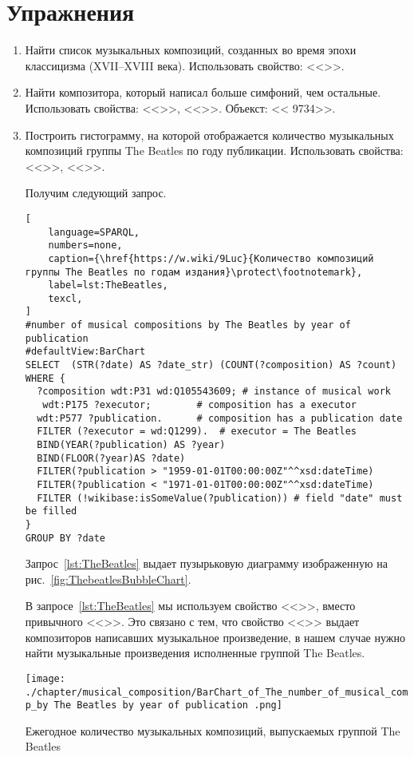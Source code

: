 \section{Упражнения}
\begin{enumerate}
\item Найти список музыкальных композиций, созданных во время эпохи классицизма (XVII--XVIII века).
Использовать свойство: <<>>.
\item Найти композитора, который написал больше симфоний, чем остальные.
Использовать свойства: <<>>, <<>>. Объекст: << {9734}>>.
\item Построить гистограмму, на которой отображается количество музыкальных композиций группы The Beatles по году публикации.
Использовать свойства: <<>>, <<>>.

Получим следующий запрос.

\begin{lstlisting}[ 
    language=SPARQL, 
    numbers=none,
    caption={\href{https://w.wiki/9Luc}{Количество композиций группы The Beatles по годам издания}\protect\footnotemark},
    label=lst:TheBeatles,
    texcl,
]
#number of musical compositions by The Beatles by year of publication
#defaultView:BarChart
SELECT  (STR(?date) AS ?date_str) (COUNT(?composition) AS ?count)  
WHERE {
  ?composition wdt:P31 wd:Q105543609; # instance of musical work
   wdt:P175 ?executor;        # composition has a executor
  wdt:P577 ?publication.      # composition has a publication date
  FILTER (?executor = wd:Q1299).  # executor = The Beatles
  BIND(YEAR(?publication) AS ?year)
  BIND(FLOOR(?year)AS ?date)
  FILTER(?publication > "1959-01-01T00:00:00Z"^^xsd:dateTime)
  FILTER(?publication < "1971-01-01T00:00:00Z"^^xsd:dateTime) 
  FILTER (!wikibase:isSomeValue(?publication)) # field "date" must be filled
}
GROUP BY ?date
\end{lstlisting}%
Запрос~\ref{lst:TheBeatles} выдает пузырьковую диаграмму изображенную на рис.~\ref{fig:ThebeatlesBubbleChart}.

В запросе~\ref{lst:TheBeatles} мы используем свойство <<>>, вместо привычного <<>>. Это связано с тем, что свойство <<>> выдает композиторов написавших музыкальное произведение, в нашем случае нужно найти музыкальные произведения исполненные группой The Beatles.

\begin{marginfigure}
	\texttt{[image: ./chapter/musical\_composition/BarChart\_of\_The\_number\_of\_musical\_comp\_by The Beatles by year of publication .png]}
	\caption[Гистограмма количества музыкальных композиций The Beatles по годам издания]{Ежегодное количество музыкальных композиций, выпускаемых группой The Beatles}%
 	\label{fig:ThebeatlesBubbleChart}%
\end{marginfigure}
\end{enumerate}
